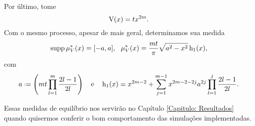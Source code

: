  
 Por último, tome $$\operatorname{V}(x) = t x^{2m}.$$ Com o mesmo processo, apesar de mais geral, determinamos sua medida 
 \begin{equation}
 	\operatorname{supp} \mu^*_V(x) = [-a, a], \ \ \mu^*_V(x) = \frac{mt}{\pi} \sqrt{a^2 - x^2} \operatorname{h_1}(x),
 	\label{Equação: Mônico}
 \end{equation}
com $$ a \deff \left( mt \prod_{l=1}^{m} \frac{2l-1}{2l}\right) \ \ \ \text{e} \ \ \ \h(x) = x^{2m-2} + \sum_{j=1}^{m-1} x^{2m-2-2j} a^{2j} \prod_{l=1}^{j} \frac{2l-1}{2l}.$$

Essas medidas de equilíbrio nos servirão no Capítulo \ref{Capitulo: Resultados} quando quisermos conferir o bom comportamento das simulações implementadas.
